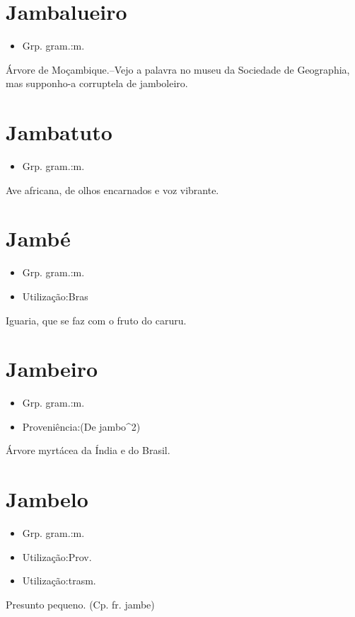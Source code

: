 \documentclass{article}
\begin{document}
\section{Jambalueiro}
\begin{itemize}
\item {Grp. gram.:m.}
\end{itemize}
Árvore de Moçambique.--Vejo a palavra no museu da \textunderscore Sociedade de Geographia\textunderscore , mas supponho-a corruptela de \textunderscore jamboleiro\textunderscore .
\section{Jambatuto}
\begin{itemize}
\item {Grp. gram.:m.}
\end{itemize}
Ave africana, de olhos encarnados e voz vibrante.
\section{Jambé}
\begin{itemize}
\item {Grp. gram.:m.}
\end{itemize}
\begin{itemize}
\item {Utilização:Bras}
\end{itemize}
Iguaria, que se faz com o fruto do caruru.
\section{Jambeiro}
\begin{itemize}
\item {Grp. gram.:m.}
\end{itemize}
\begin{itemize}
\item {Proveniência:(De \textunderscore jambo\textunderscore ^2)}
\end{itemize}
Árvore myrtácea da Índia e do Brasil.
\section{Jambelo}
\begin{itemize}
\item {Grp. gram.:m.}
\end{itemize}
\begin{itemize}
\item {Utilização:Prov.}
\end{itemize}
\begin{itemize}
\item {Utilização:trasm.}
\end{itemize}
Presunto pequeno.
(Cp. fr. \textunderscore jambe\textunderscore )
\end{document}
